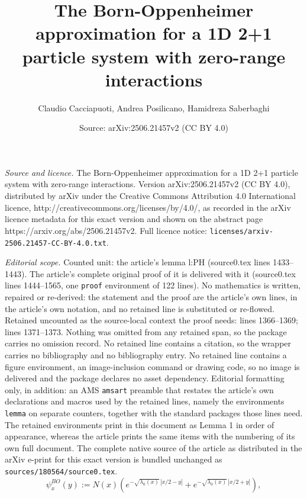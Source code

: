 \documentclass[10pt,a4paper]{amsart}
\title{The Born-Oppenheimer approximation for a 1D 2+1 particle system with zero-range interactions}
\author{Claudio Cacciapuoti, Andrea Posilicano, Hamidreza Saberbaghi}
\date{Source: arXiv:2506.21457v2 (CC BY 4.0)}
\begin{document}
\maketitle

\noindent\emph{Source and licence.} The Born-Oppenheimer approximation for a 1D 2+1 particle system with zero-range interactions. Version arXiv:2506.21457v2 (CC BY 4.0), distributed by arXiv under the Creative Commons Attribution 4.0 International licence, http://creativecommons.org/licenses/by/4.0/, as recorded in the arXiv licence metadata for this exact version and shown on the abstract page https://arxiv.org/abs/2506.21457v2. Full licence notice: \texttt{licenses/arxiv-2506.21457-CC-BY-4.0.txt}.\par\smallskip

\noindent\textit{Editorial scope.} Counted unit: the article's lemma l:PH (source0.tex lines 1433--1443). The article's complete original proof of it is delivered with it (source0.tex lines 1444--1565, one \texttt{proof} environment of 122 lines). No mathematics is written, repaired or re-derived: the statement and the proof are the article's own lines, in the article's own notation, and no retained line is substituted or re-flowed.  Retained uncounted as the source-local context the proof needs: lines 1366--1369; lines 1371--1373.  Nothing was omitted from any retained span, so the package carries no omission record.  No retained line contains a citation, so the wrapper carries no bibliography and no bibliography entry.  No retained line contains a figure environment, an image-inclusion command or drawing code, so no image is delivered and the package declares no asset dependency.  Editorial formatting only, in addition: an AMS \texttt{amsart} preamble that restates the article's own declarations and macros used by the retained lines, namely the environments \texttt{lemma} on separate counters, together with the standard packages those lines need.  The retained environments print in this document as Lemma 1 in order of appearance, whereas the article prints the same items with the numbering of its own full document.  The complete native source of the article as distributed in the arXiv e-print for this exact version is bundled unchanged as \texttt{sources/180564/source0.tex}.
\begin{equation}\label{psiBOx}
 \psi^{BO}_{x}(y) :=    N(x) 
\left(e^{-\sqrt{\lambda_{0}(x)}\,|x/2-y|} + e^{-\sqrt{\lambda_{0}(x)}\,|x/2+y|}\right) ,
\end{equation}
\end{document}
